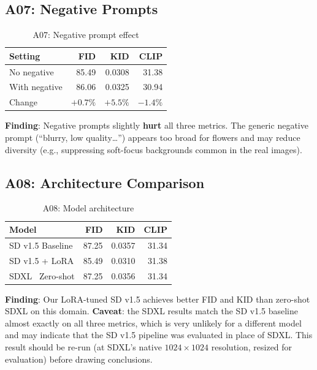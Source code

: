 \documentclass[11pt]{article}
\begin{document}
\subsection{A07: Negative Prompts}

\begin{table}[!htbp]
\centering
\caption{A07: Negative prompt effect}
\begin{tabular}{lrrr}
\toprule
Setting & FID & KID & CLIP \\
\midrule
No negative & 85.49 & 0.0308 & 31.38 \\
With negative & 86.06 & 0.0325 & 30.94 \\
Change & $+0.7\%$ & $+5.5\%$ & $-1.4\%$ \\
\bottomrule
\end{tabular}
\end{table}

\textbf{Finding}: Negative prompts slightly \textbf{hurt} all three metrics. The generic negative prompt (``blurry, low quality\ldots'') appears too broad for flowers and may reduce diversity (e.g., suppressing soft-focus backgrounds common in the real images).

\subsection{A08: Architecture Comparison}
\label{sec:a08}

\begin{table}[!htbp]
\centering
\caption{A08: Model architecture}
\begin{tabular}{lrrr}
\toprule
Model & FID & KID & CLIP \\
\midrule
SD v1.5 Baseline & 87.25 & 0.0357 & 31.34 \\
SD v1.5 + LoRA & 85.49 & 0.0310 & 31.38 \\
SDXL~\cite{podell2023sdxl} Zero-shot & 87.25 & 0.0356 & 31.34 \\
\bottomrule
\end{tabular}
\end{table}

\textbf{Finding}: Our LoRA-tuned SD v1.5 achieves better FID and KID than zero-shot SDXL on this domain. \textbf{Caveat}: the SDXL results match the SD v1.5 baseline almost exactly on all three metrics, which is very unlikely for a different model and may indicate that the SD v1.5 pipeline was evaluated in place of SDXL. This result should be re-run (at SDXL's native $1024 \times 1024$ resolution, resized for evaluation) before drawing conclusions.
\end{document}
